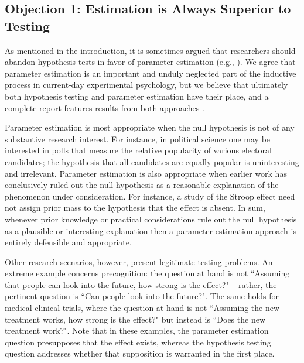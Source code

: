 \subsection{Objection 1: Estimation is Always Superior to Testing}
As mentioned in the introduction, it is sometimes argued that researchers should abandon hypothesis tests in favor of parameter estimation (e.g., ). We agree that parameter estimation is an important and unduly neglected part of the inductive process in current-day experimental psychology, but we believe that ultimately both hypothesis testing and parameter estimation have their place, and a complete report features results from both approaches \cite{Berger2006}.

Parameter estimation is most appropriate when the null hypothesis is not of any substantive research interest. For instance, in political science one may be interested in polls that measure the relative popularity of various electoral candidates; the hypothesis that all candidates are equally popular is uninteresting and irrelevant. Parameter estimation is also appropriate when earlier work has conclusively ruled out the null hypothesis as a reasonable explanation of the phenomenon under consideration. For instance, a study of the Stroop effect need not assign prior mass to the hypothesis that the effect is absent. In sum, whenever prior knowledge or practical considerations rule out the null hypothesis as a plausible or interesting explanation then a parameter estimation approach is entirely defensible and appropriate.

Other research scenarios, however, present legitimate testing problems. An extreme example concerns precognition: the question at hand is not ``Assuming that people can look into the future, how strong is the effect?" -- rather, the pertinent question is ``Can people look into the future?". The same holds for medical clinical trials, where the question at hand is not ``Assuming the new treatment works, how strong is the effect?" but instead is ``Does the new treatment work?". Note that in these examples, the parameter estimation question presupposes that the effect exists, whereas the hypothesis testing question addresses whether that supposition is warranted in the first place.


